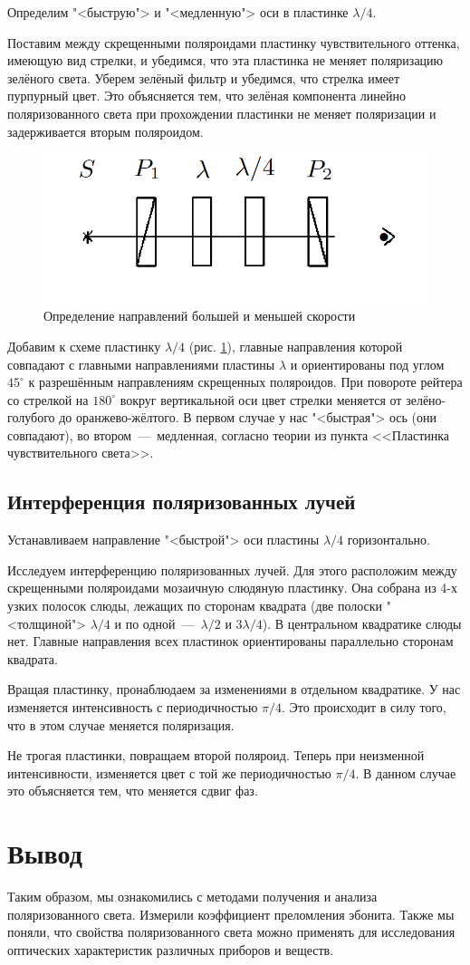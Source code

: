 \documentclass[a4paper,12pt]{article}
\begin{document}
Определим "<быструю"> и "<медленную"> оси в пластинке $ \lambda/4 $.

Поставим между скрещенными поляроидами пластинку чувствительного оттенка, имеющую вид стрелки, и убедимся, что эта пластинка не меняет поляризацию зелёного света. Уберем зелёный фильтр и убедимся, что стрелка имеет пурпурный
цвет. Это объясняется тем, что зелёная компонента линейно поляризованного света при прохождении пластинки не меняет поляризации и задерживается вторым поляроидом.

\begin{figure}[h] 
	\centering
	\includegraphics[width=0.3\linewidth]{8}
	\caption{Определение направлений большей и меньшей скорости}
	\label{ris 8}
\end{figure}

Добавим к схеме пластинку $ \lambda/4 $
(рис. \ref{ris 8}), главные направления которой совпадают с главными направлениями пластины $ \lambda $ и ориентированы
под углом $ 45^\circ $ к разрешённым направлениям скрещенных поляроидов.
При повороте рейтера со стрелкой на $ 180^\circ $ вокруг вертикальной оси
цвет стрелки меняется от зелёно-голубого до оранжево-жёлтого. В первом случае у нас "<быстрая"> ось (они совпадают), во втором~---~медленная, согласно теории из пункта <<Пластинка чувствительного света>>.

\subsection*{Интерференция поляризованных лучей}

Устанавливаем направление "<быстрой"> оси пластины $ \lambda/4 $ горизонтально.

Исследуем интерференцию поляризованных лучей. Для этого расположим между скрещенными поляроидами мозаичную слюдяную пластинку. Она собрана из 4-х узких полосок слюды, лежащих по сторонам квадрата (две полоски "<толщиной"> $ \lambda/4 $ и по одной~---~$ \lambda/2 $ и $ 3\lambda/4 $). В центральном квадратике слюды нет. Главные направления всех пластинок ориентированы параллельно сторонам квадрата.

Вращая пластинку, пронаблюдаем за изменениями в отдельном квадратике. У нас изменяется интенсивность с периодичностью $\pi/4$. Это происходит в силу того, что в этом случае меняется поляризация. 

Не трогая пластинки, повращаем второй поляроид. Теперь при неизменной интенсивности, изменяется цвет с той же периодичностью $\pi/4$. В данном случае это объясняется тем, что меняется сдвиг фаз.

\section*{Вывод}

Таким образом, мы ознакомились с методами получения и анализа поляризованного света. Измерили коэффициент преломления эбонита. Также мы поняли, что свойства поляризованного света можно применять для исследования оптических характеристик различных приборов и веществ.
\end{document}
